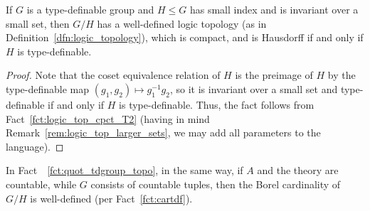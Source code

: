 	\begin{fct}
		\label{fct:quot_tdgroup_topo}
		If $G$ is a type-definable group and $H\leq G$ has small index and is invariant over a small set, then $G/H$ has a well-defined logic topology (as in Definition~\ref{dfn:logic_topology}), which is compact, and is Hausdorff if and only if $H$ is type-definable.
	\end{fct}
	\begin{proof}
		Note that the coset equivalence relation of $H$ is the preimage of $H$ by the type-definable map $(g_1,g_2)\mapsto g_1^{-1}g_2$, so it is invariant over a small set and type-definable if and only if $H$ is type-definable. Thus, the fact follows from Fact~\ref{fct:logic_top_cpct_T2} (having in mind Remark~\ref{rem:logic_top_larger_sets}, we may add all parameters to the language).
	\end{proof}
	\begin{rem}
		In Fact~~\ref{fct:quot_tdgroup_topo}, in the same way, if $A$ and the theory are countable, while $G$ consists of countable tuples, then the Borel cardinality of $G/H$ is well-defined (per Fact~\ref{fct:cartdf}).
		\xqed{\lozenge}
	\end{rem}
	
